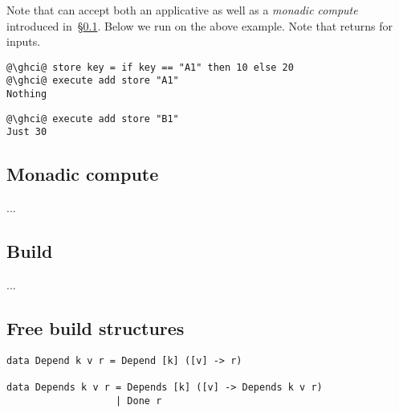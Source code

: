 \noindent
Note that  can accept both an applicative as well as a \emph{monadic
compute} introduced in~\S\ref{sec-compute-monad}. Below we run  on
the above  example. Note that  returns  for
inputs.

\vspace{1mm}
\begin{verbatim}
@\ghci@ store key = if key == "A1" then 10 else 20
@\ghci@ execute add store "A1"
Nothing
\end{verbatim}
\vspace{1mm}
\begin{verbatim}
@\ghci@ execute add store "B1"
Just 30
\end{verbatim}
\vspace{1mm}

\subsection{Monadic compute}\label{sec-compute-monad}

...

\subsection{Build}\label{sec-general-build}

...


\subsection{Free build structures}\label{sec-free-build}

\begin{verbatim}
data Depend k v r = Depend [k] ([v] -> r)

data Depends k v r = Depends [k] ([v] -> Depends k v r)
                   | Done r
\end{verbatim}
